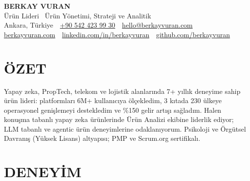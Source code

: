 \documentclass[10pt,letterpaper]{article}
\begin{document}
\begin{center}
  {\fontsize{21}{23}\selectfont\bfseries\color{accent}BERKAY VURAN}\\[2pt]
  Ürün Lideri \textbar\ Ürün Yönetimi, Strateji ve Analitik\\[2pt]
  {\small Ankara, Türkiye \,\textbullet\,
  \href{tel:+905424239930}{+90 542 423 99 30} \,\textbullet\,
  \href{mailto:hello@berkayvuran.com}{hello@berkayvuran.com} \,\textbullet\,
  \href{https://berkayvuran.com}{berkayvuran.com} \,\textbullet\,
  \href{https://www.linkedin.com/in/berkayvuran}{linkedin.com/in/berkayvuran} \,\textbullet\,
  \href{https://github.com/berkayvuran}{github.com/berkayvuran}}
\end{center}

\vspace{-3pt}

\section{ÖZET}
Yapay zeka, PropTech, telekom ve lojistik alanlarında 7+ yıllık deneyime sahip ürün lideri: platformları 6M+ kullanıcıya ölçekledim, 3 kıtada 230 ülkeye operasyonel genişlemeyi destekledim ve \%150 gelir artışı sağladım. Halen konuşma tabanlı yapay zeka ürünlerinde Ürün Analizi ekibine liderlik ediyor; LLM tabanlı ve agentic ürün deneyimlerine odaklanıyorum. Psikoloji ve Örgütsel Davranış (Yüksek Lisans) altyapısı; PMP ve Scrum.org sertifikalı.

\section{DENEYİM}
\end{document}
